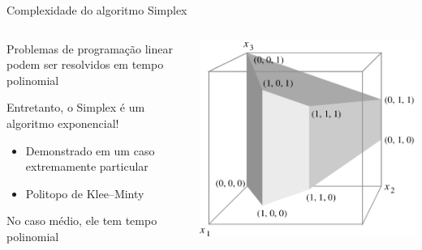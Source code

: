 \documentclass[compress,mathserif]{beamer}
\begin{document}

\begin{frame}{Complexidade do algoritmo Simplex}

\begin{columns}[T]
    \begin{column}{.43\textwidth}
    Problemas de programação linear podem ser resolvidos em tempo polinomial

    \vspace{0.5cm}
    
    Entretanto, o Simplex é um algoritmo exponencial! \href{https://en.wikipedia.org/wiki/Klee\%E2\%80\%93Minty\_cube}{}
    \begin{itemize}
        \item Demonstrado em um caso extremamente particular
        \item Politopo de Klee–Minty 
    \end{itemize}

    \vspace{0.5cm}
    
    No caso médio, ele tem tempo polinomial
    
\end{column}
    \begin{column}{.56\textwidth}
    \vspace{1cm}
    \centering \includegraphics[width=\textwidth]{images/km_cube.png}
    \end{column}
\end{columns}


\end{frame}
\end{document}

